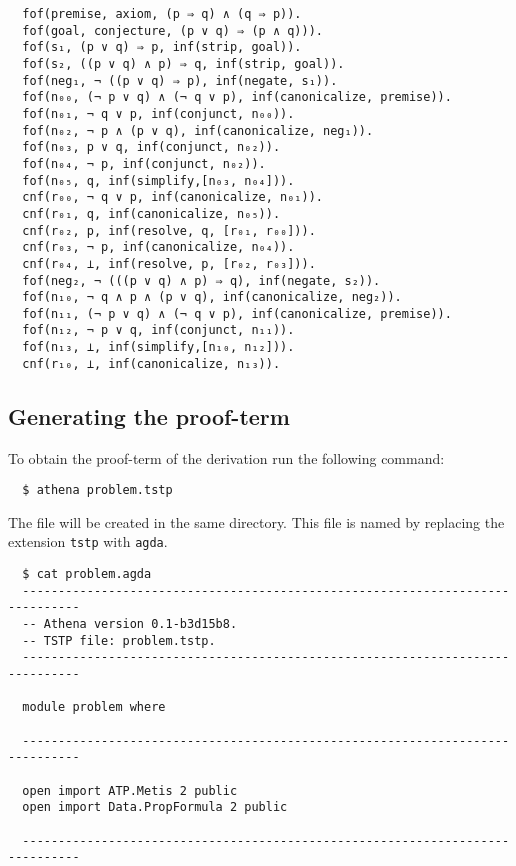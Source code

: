 \documentclass[../main.tex]{subfiles}
\begin{document}
\begin{subappendices}
\begin{verbatim}
  fof(premise, axiom, (p ⇒ q) ∧ (q ⇒ p)).
  fof(goal, conjecture, (p ∨ q) ⇒ (p ∧ q))).
  fof(s₁, (p ∨ q) ⇒ p, inf(strip, goal)).
  fof(s₂, ((p ∨ q) ∧ p) ⇒ q, inf(strip, goal)).
  fof(neg₁, ¬ ((p ∨ q) ⇒ p), inf(negate, s₁)).
  fof(n₀₀, (¬ p ∨ q) ∧ (¬ q ∨ p), inf(canonicalize, premise)).
  fof(n₀₁, ¬ q ∨ p, inf(conjunct, n₀₀)).
  fof(n₀₂, ¬ p ∧ (p ∨ q), inf(canonicalize, neg₁)).
  fof(n₀₃, p ∨ q, inf(conjunct, n₀₂)).
  fof(n₀₄, ¬ p, inf(conjunct, n₀₂)).
  fof(n₀₅, q, inf(simplify,[n₀₃, n₀₄])).
  cnf(r₀₀, ¬ q ∨ p, inf(canonicalize, n₀₁)).
  cnf(r₀₁, q, inf(canonicalize, n₀₅)).
  cnf(r₀₂, p, inf(resolve, q, [r₀₁, r₀₀])).
  cnf(r₀₃, ¬ p, inf(canonicalize, n₀₄)).
  cnf(r₀₄, ⊥, inf(resolve, p, [r₀₂, r₀₃])).
  fof(neg₂, ¬ (((p ∨ q) ∧ p) ⇒ q), inf(negate, s₂)).
  fof(n₁₀, ¬ q ∧ p ∧ (p ∨ q), inf(canonicalize, neg₂)).
  fof(n₁₁, (¬ p ∨ q) ∧ (¬ q ∨ p), inf(canonicalize, premise)).
  fof(n₁₂, ¬ p ∨ q, inf(conjunct, n₁₁)).
  fof(n₁₃, ⊥, inf(simplify,[n₁₀, n₁₂])).
  cnf(r₁₀, ⊥, inf(canonicalize, n₁₃)).
\end{verbatim}

\subsection{Generating the \Agda proof-term}

To obtain the \Agda proof-term of the \Metis derivation run
the following command:

\begin{verbatim}
  $ athena problem.tstp
\end{verbatim}

The \Agda file will be created in the same directory. This
file is named by replacing the extension \verb!tstp! with \verb!agda!.

\begin{verbatim}
  $ cat problem.agda
  ------------------------------------------------------------------------------
  -- Athena version 0.1-b3d15b8.
  -- TSTP file: problem.tstp.
  ------------------------------------------------------------------------------

  module problem where

  ------------------------------------------------------------------------------

  open import ATP.Metis 2 public
  open import Data.PropFormula 2 public

  ------------------------------------------------------------------------------


\end{verbatim}
\end{subappendices}
\end{document}

